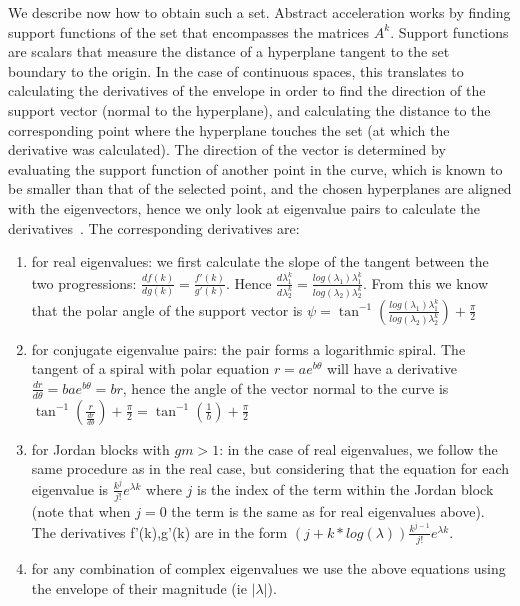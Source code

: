\documentclass[twocolumn]{autart}    %
\newcommand{\mat}[1]{{#1}}
\begin{document}
We describe now how to obtain such a set. Abstract acceleration works by finding support functions of the set that encompasses the matrices $\mat{A}^k$.
Support functions are scalars that measure the distance of a hyperplane tangent to the set boundary to the origin.
In the case of continuous spaces, this translates to calculating the derivatives of the envelope in order to find the direction of the support vector (normal to the hyperplane), and calculating the distance to the corresponding point where the hyperplane touches the set (at which the derivative was calculated).
The direction of the vector is determined by evaluating the support function of another point in the curve,
which is known to be smaller than that of the selected point, and the chosen hyperplanes are aligned with the eigenvectors, hence we only look at eigenvalue pairs to calculate the derivatives~\cite{cattaruzza2015unbounded}.
The corresponding derivatives are:
%
\begin{enumerate}
%
\item for real eigenvalues: we first calculate the slope of the tangent
between the two progressions: $\frac{d f(k)}{d g(k)}=\frac{f'(k)}{g'(k)}$. 
Hence $\frac{d \lambda_1^k}{d \lambda_2^k}=\frac{log(\lambda_1)
\lambda_1^k}{log(\lambda_2) \lambda_2^k}$.  From this we know that the polar
angle of the support vector is $\psi = \tan^{-1}(\frac{log(\lambda_1)
\lambda_1^k}{log(\lambda_2) \lambda_2^k})+\frac{\pi}{2}$
%
\item for conjugate eigenvalue pairs: the pair forms a logarithmic spiral. 
The tangent of a spiral with polar equation $r=a e^{b\theta}$ will have a
derivative $\frac{d r}{d \theta}=b a e^{b\theta}=b r$, hence the angle of
the vector normal to the curve is $\tan^{-1}(\frac{r}{\frac{d r}{d
\theta}})+\frac{\pi}{2}=\tan^{-1}(\frac{1}{b})+\frac{\pi}{2}$
%
\item for Jordan blocks with $gm>1$: in the case of real eigenvalues, we
follow the same procedure as in the real case, but considering that the
equation for each eigenvalue is $\frac{k^j}{j!}e^{\lambda k}$ where $j$ is
the index of the term within the Jordan block (note that when $j=0$ the term
is the same as for real eigenvalues above).  The derivatives f'(k),g'(k) are
in the form $(j+k*log(\lambda))\frac{k^{j-1}}{j!}e^{\lambda k}$.
%
\item for any combination of complex eigenvalues we use the above equations
using the envelope of their magnitude (ie $|\lambda|$).
%
\end{enumerate}
\end{document}
